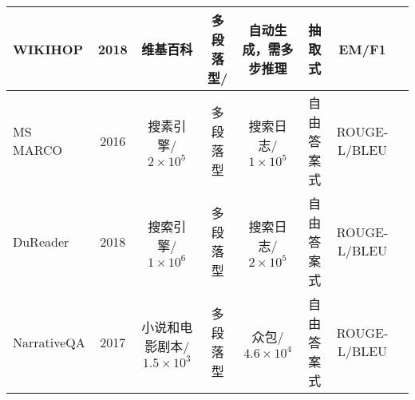 \begin{table}[ht]
{\begin{tabular}{l c c c c c c c}
			\midrule
			WIKIHOP\upcite{WIKIHOP}&2018&维基百科&多段落型/&自动生成，需多步推理&抽取式&EM/F1 \\
			\midrule
			MS MARCO\upcite{MSmarco}&2016&搜素引擎/$2\times 10^5$&多段落型&搜索日志/$1\times 10^5$&自由答案式&ROUGE-L/BLEU\\
			\midrule
			DuReader\upcite{DuReader}&2018&搜索引擎/$1\times 10^6$&多段落型&搜索日志/$2\times 10^5$&自由答案式&ROUGE-L/BLEU\\
			\midrule
			NarrativeQA\upcite{NarrativeQA}&2017&小说和电影剧本/$1.5\times 10^3$&多段落型&众包/$4.6\times 10^4$&自由答案式&ROUGE-L/BLEU\\
			\bottomrule
		\end{tabular}
	}
\end{table}



